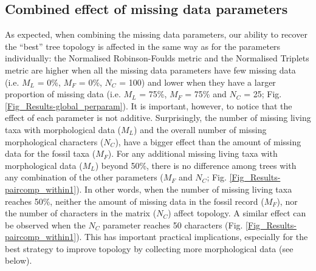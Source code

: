 \subsection{Combined effect of missing data parameters}
As expected, when combining the missing data parameters, our ability to recover the ``best'' tree topology is affected in the same way as for the parameters individually: the Normalised Robinson-Foulds metric and the Normalised Triplets metric are higher when all the missing data parameters have few missing data (i.e. $M_{L}$ = 0\%, $M_{F}$ = 0\%, $N_{C}$ = 100) and lower when they have a larger proportion of missing data (i.e. $M_{L}$ = 75\%, $M_{F}$ = 75\% and $N_{C}$ = 25; Fig. \ref{Fig_Results-global_perparam}).
It is important, however, to notice that the effect of each parameter is not additive.
Surprisingly, the number of missing living taxa with morphological data ($M_{L}$) and the overall number of missing morphological characters ($N_{C}$), have a bigger effect than the amount of missing data for the fossil taxa ($M_{F}$).
For any additional missing living taxa with morphological data ($M_L$) beyond 50\%, there is no difference among trees with any combination of the other parameters ($M_F$ and $N_C$; Fig. \ref{Fig_Results-paircomp_within1}).
In other words, when the number of missing living taxa reaches 50\%, neither the amount of missing data in the fossil record ($M_F$), nor the number of characters in the matrix ($N_C$) affect topology.
A similar effect can be observed when the $N_C$ parameter reaches 50 characters (Fig. \ref{Fig_Results-paircomp_within1}).
This has important practical implications, especially for the best strategy to improve topology by collecting more morphological data (see below).

